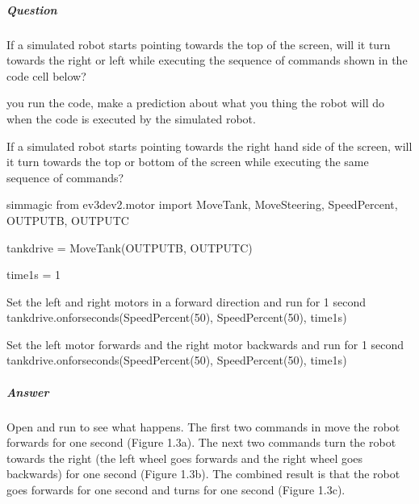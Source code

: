 \documentclass[letterpaper,10pt,english]{sphinxmanual}
\begin{document}
\subparagraph{Question}
\label{\detokenize{content/01_Robot_Lab/Section_00_01:Question}}
If a simulated robot starts pointing towards the top of the screen, will it turn towards the right or left while executing the sequence of commands shown in the code cell below?

 you run the code, make a prediction about what you thing the robot will do when the code is executed by the simulated robot.

If a simulated robot starts pointing towards the right hand side of the screen, will it turn towards the top or bottom of the screen while executing the same sequence of commands?



{
\begin{sphinxVerbatim}[commandchars=\\\{\}]
\llap{\color{nbsphinxin}[ ]:\,\hspace{\fboxrule}\hspace{\fboxsep}}\PYGZpc{}\PYGZpc{}sim\PYGZus{}magic
from ev3dev2.motor import MoveTank, MoveSteering, SpeedPercent, OUTPUT\PYGZus{}B, OUTPUT\PYGZus{}C

tank\PYGZus{}drive = MoveTank(OUTPUT\PYGZus{}B, OUTPUT\PYGZus{}C)

time\PYGZus{}1s = 1

\PYGZsh{} Set the left and right motors in a forward direction
\PYGZsh{} and run for 1 second
tank\PYGZus{}drive.on\PYGZus{}for\PYGZus{}seconds(SpeedPercent(50), SpeedPercent(50), time\PYGZus{}1s)


\PYGZsh{} Set the left motor forwards and the right motor backwards
\PYGZsh{} and run for 1 second
tank\PYGZus{}drive.on\PYGZus{}for\PYGZus{}seconds(SpeedPercent(50), SpeedPercent(\PYGZhy{}50), time\PYGZus{}1s)
\end{sphinxVerbatim}
}


\subparagraph{Answer}
\label{\detokenize{content/01_Robot_Lab/Section_00_01:id1}}
Open and run  to see what happens. The first two commands in  move the robot forwards for one second (Figure 1.3a). The next two commands turn the robot towards the right (the left wheel goes forwards and the right wheel goes backwards) for one second (Figure 1.3b). The combined result is that the robot goes forwards for one second and turns for one second (Figure 1.3c).
\end{document}
